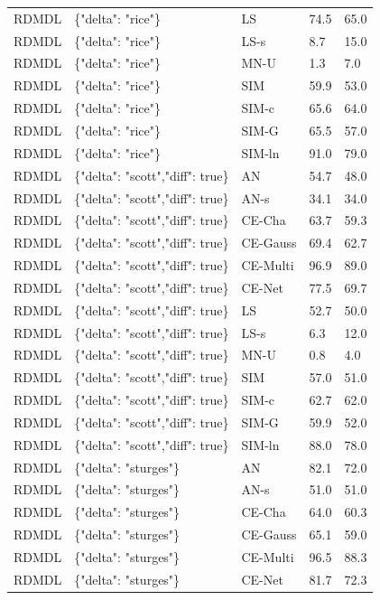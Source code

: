 \begin{tabular}{lllll}
RDMDL & \{"delta": "rice"\} & LS & 74.5 & 65.0 \\
RDMDL & \{"delta": "rice"\} & LS-s & 8.7 & 15.0 \\
RDMDL & \{"delta": "rice"\} & MN-U & 1.3 & 7.0 \\
RDMDL & \{"delta": "rice"\} & SIM & 59.9 & 53.0 \\
RDMDL & \{"delta": "rice"\} & SIM-c & 65.6 & 64.0 \\
RDMDL & \{"delta": "rice"\} & SIM-G & 65.5 & 57.0 \\
RDMDL & \{"delta": "rice"\} & SIM-ln & 91.0 & 79.0 \\
RDMDL & \{"delta": "scott","diff": true\} & AN & 54.7 & 48.0 \\
RDMDL & \{"delta": "scott","diff": true\} & AN-s & 34.1 & 34.0 \\
RDMDL & \{"delta": "scott","diff": true\} & CE-Cha & 63.7 & 59.3 \\
RDMDL & \{"delta": "scott","diff": true\} & CE-Gauss & 69.4 & 62.7 \\
RDMDL & \{"delta": "scott","diff": true\} & CE-Multi & 96.9 & 89.0 \\
RDMDL & \{"delta": "scott","diff": true\} & CE-Net & 77.5 & 69.7 \\
RDMDL & \{"delta": "scott","diff": true\} & LS & 52.7 & 50.0 \\
RDMDL & \{"delta": "scott","diff": true\} & LS-s & 6.3 & 12.0 \\
RDMDL & \{"delta": "scott","diff": true\} & MN-U & 0.8 & 4.0 \\
RDMDL & \{"delta": "scott","diff": true\} & SIM & 57.0 & 51.0 \\
RDMDL & \{"delta": "scott","diff": true\} & SIM-c & 62.7 & 62.0 \\
RDMDL & \{"delta": "scott","diff": true\} & SIM-G & 59.9 & 52.0 \\
RDMDL & \{"delta": "scott","diff": true\} & SIM-ln & 88.0 & 78.0 \\
RDMDL & \{"delta": "sturges"\} & AN & 82.1 & 72.0 \\
RDMDL & \{"delta": "sturges"\} & AN-s & 51.0 & 51.0 \\
RDMDL & \{"delta": "sturges"\} & CE-Cha & 64.0 & 60.3 \\
RDMDL & \{"delta": "sturges"\} & CE-Gauss & 65.1 & 59.0 \\
RDMDL & \{"delta": "sturges"\} & CE-Multi & 96.5 & 88.3 \\
RDMDL & \{"delta": "sturges"\} & CE-Net & 81.7 & 72.3 \\

\end{tabular}
